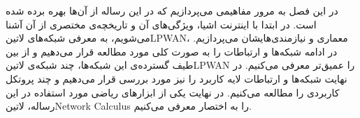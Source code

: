 
در این فصل به مرور مفاهیمی می‌پردازیم که در این رساله از آن‌ها بهره برده شده است. در ابتدا با اینترنت اشیا، ویژگی‌های آن و تاریخچه‌ی مختصری از آن آشنا می‌شویم،
به معرفی شبکه‌های ‌لاتین{LPWAN}، معماری و نیازمندی‌هایشان
می‌پردازیم. در ادامه شبکه‌ها و ارتباطات را به صورت کلی مورد مطالعه قرار می‌دهیم و از بین طیف گسترده‌ی این شبکه‌ها، چند شبکه‌ی ‌لاتین{LPWAN} را عمیق‌تر
معرفی می‌کنیم. در نهایت شبکه‌ها و ارتباطات لایه کاربرد را نیز مورد بررسی قرار می‌دهیم و چند پروتکل کاربردی را مطالعه می‌کنیم. در نهایت یکی از ابزارهای ریاضی
مورد استفاده در این رساله، ‌لاتین{Network Calculus} را به اختصار معرفی می‌کنیم.













